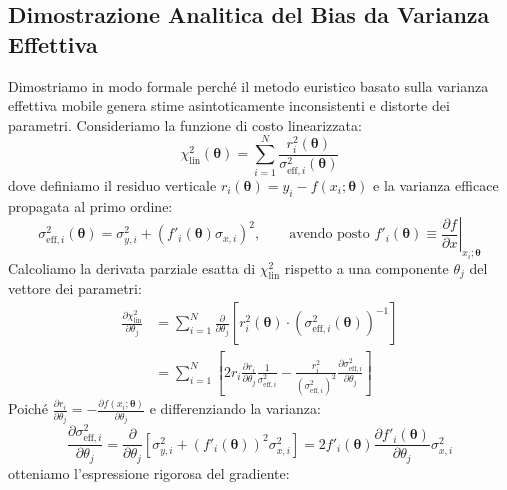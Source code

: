\documentclass[11pt,a4paper]{article}
\begin{document}
\subsection{Dimostrazione Analitica del Bias da Varianza Effettiva}
\label{sec:bias_proof}

Dimostriamo in modo formale perché il metodo euristico basato sulla varianza effettiva mobile genera stime asintoticamente inconsistenti e distorte dei parametri.
Consideriamo la funzione di costo linearizzata:
\begin{equation}
    \chi^2_{\text{lin}}(\boldsymbol{\theta}) = \sum_{i=1}^N \frac{r_i^2(\boldsymbol{\theta})}{\sigma_{\text{eff}, i}^2(\boldsymbol{\theta})}
\end{equation}
dove definiamo il residuo verticale $r_i(\boldsymbol{\theta}) = y_i - f(x_i; \boldsymbol{\theta})$ e la varianza efficace propagata al primo ordine:
\begin{equation}
    \sigma_{\text{eff}, i}^2(\boldsymbol{\theta}) = \sigma_{y, i}^2 + \left( f'_i(\boldsymbol{\theta}) \sigma_{x, i} \right)^2, \qquad \text{avendo posto } f'_i(\boldsymbol{\theta}) \equiv \left.\frac{\partial f}{\partial x}\right|_{x_i; \boldsymbol{\theta}}
\end{equation}
Calcoliamo la derivata parziale esatta di $\chi^2_{\text{lin}}$ rispetto a una componente $\theta_j$ del vettore dei parametri:
\begin{align}
    \frac{\partial \chi^2_{\text{lin}}}{\partial \theta_j} &= \sum_{i=1}^N \frac{\partial}{\partial \theta_j} \left[ r_i^2(\boldsymbol{\theta}) \cdot \left(\sigma_{\text{eff}, i}^2(\boldsymbol{\theta})\right)^{-1} \right] \nonumber \\
    &= \sum_{i=1}^N \left[ 2 r_i \frac{\partial r_i}{\partial \theta_j} \frac{1}{\sigma_{\text{eff}, i}^2} - \frac{r_i^2}{\left(\sigma_{\text{eff}, i}^2\right)^2} \frac{\partial \sigma_{\text{eff}, i}^2}{\partial \theta_j} \right]
\end{align}
Poiché $\frac{\partial r_i}{\partial \theta_j} = - \frac{\partial f(x_i; \boldsymbol{\theta})}{\partial \theta_j}$ e differenziando la varianza:
\begin{equation}
    \frac{\partial \sigma_{\text{eff}, i}^2}{\partial \theta_j} = \frac{\partial}{\partial \theta_j} \left[ \sigma_{y, i}^2 + \left( f'_i(\boldsymbol{\theta}) \right)^2 \sigma_{x, i}^2 \right] = 2 f'_i(\boldsymbol{\theta}) \frac{\partial f'_i(\boldsymbol{\theta})}{\partial \theta_j} \sigma_{x, i}^2
\end{equation}
otteniamo l'espressione rigorosa del gradiente:
\end{document}
